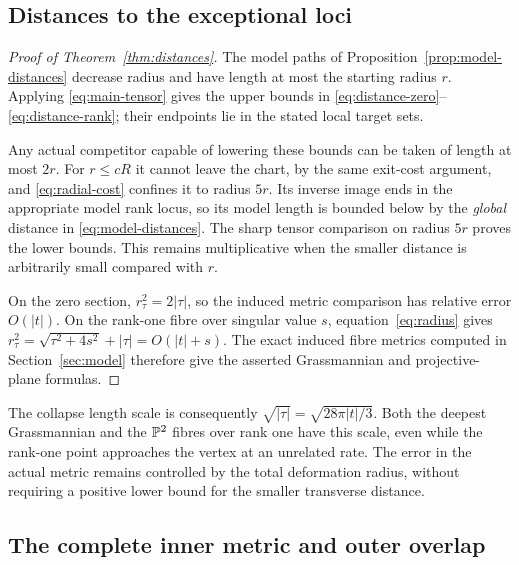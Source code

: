 \subsection{Distances to the exceptional loci}

\begin{proof}[Proof of Theorem~\ref{thm:distances}]
The model paths of Proposition~\ref{prop:model-distances} decrease
radius and have length at most the starting radius $r$. Applying
\eqref{eq:main-tensor} gives the upper bounds in
\eqref{eq:distance-zero}--\eqref{eq:distance-rank}; their endpoints
lie in the stated local target sets.

Any actual competitor capable of lowering these bounds can be
taken of length at most $2r$. For $r\le cR$ it cannot leave the
chart, by the same exit-cost argument, and
\eqref{eq:radial-cost} confines it to radius $5r$. Its inverse
image ends in the appropriate model rank locus, so its model
length is bounded below by the \emph{global} distance in
\eqref{eq:model-distances}. The sharp tensor comparison on
radius $5r$ proves the lower bounds. This remains multiplicative
when the smaller distance is arbitrarily small compared with $r$.

On the zero section, $r_\tau^2=2|\tau|$, so the induced metric
comparison has relative error $O(|t|)$. On the rank-one fibre
over singular value $s$, equation~\eqref{eq:radius} gives
$r_\tau^2=\sqrt{\tau^2+4s^2}+|\tau|=O(|t|+s)$.
The exact induced fibre metrics computed in
Section~\ref{sec:model} therefore give the asserted
Grassmannian and projective-plane formulas.
\end{proof}

The collapse length scale is consequently
$\sqrt{|\tau|}=\sqrt{28\pi|t|/3}$. Both the deepest Grassmannian
and the $\mathbb P^2$ fibres over rank one have this scale, even while
the rank-one point approaches the vertex at an unrelated rate.
The error in the actual metric remains controlled by the total
deformation radius, without requiring a positive lower bound for
the smaller transverse distance.

\subsection{The complete inner metric and outer overlap}

